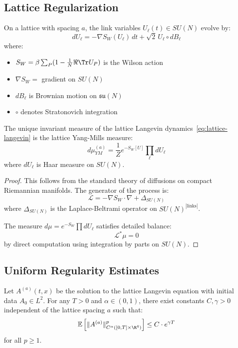 \subsection{Lattice Regularization}

\begin{definition}
On a lattice with spacing $a$, the link variables $U_\ell(t) \in SU(N)$ evolve by:
\begin{equation}
\label{eq:lattice-langevin}
dU_\ell = -\nabla S_W(U_\ell) \, dt + \sqrt{2} \, U_\ell \circ dB_\ell
\end{equation}
where:
\begin{itemize}
\item $S_W = \beta \sum_P (1 - \frac{1}{N}\Re\Tr U_P)$ is the Wilson action
\item $\nabla S_W = $ gradient on $SU(N)$
\item $dB_\ell$ is Brownian motion on $\mathfrak{su}(N)$
\item $\circ$ denotes Stratonovich integration
\end{itemize}
\end{definition}

\begin{theorem}
\label{thm:invariant-measure}
The unique invariant measure of the lattice Langevin dynamics~\eqref{eq:lattice-langevin} 
is the lattice Yang-Mills measure:
\[
d\mu_{YM}^{(a)} = \frac{1}{Z} e^{-S_W[U]} \prod_\ell dU_\ell
\]
where $dU_\ell$ is Haar measure on $SU(N)$.
\end{theorem}

\begin{proof}
This follows from the standard theory of diffusions on compact Riemannian 
manifolds. The generator of the process is:
\[
\mathcal{L} = -\nabla S_W \cdot \nabla + \Delta_{SU(N)}
\]
where $\Delta_{SU(N)}$ is the Laplace-Beltrami operator on $SU(N)^{|\text{links}|}$.

The measure $d\mu = e^{-S_W} \prod dU_\ell$ satisfies detailed balance:
\[
\mathcal{L}^* \mu = 0
\]
by direct computation using integration by parts on $SU(N)$.
\end{proof}

\subsection{Uniform Regularity Estimates}

\begin{theorem}
\label{thm:schauder}
Let $A^{(a)}(t, x)$ be the solution to the lattice Langevin equation with 
initial data $A_0 \in L^2$. For any $T > 0$ and $\alpha \in (0, 1)$, there 
exist constants $C, \gamma > 0$ independent of the lattice spacing $a$ such that:
\[
\mathbb{E}\left[\|A^{(a)}\|_{C^{\alpha}([0,T] \times \R^4)}^p\right] \leq C \cdot e^{\gamma T}
\]
for all $p \geq 1$.
\end{theorem}

